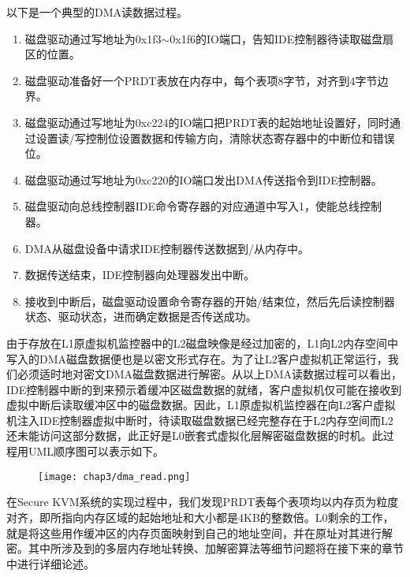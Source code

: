 以下是一个典型的DMA读数据过程。

\begin{enumerate}
\item 磁盘驱动通过写地址为0x1f3$\sim$0x1f6的IO端口，告知IDE控制器待读取磁盘扇区的位置。

\item 磁盘驱动准备好一个PRDT表放在内存中，每个表项8字节，对齐到4字节边界。

\item 磁盘驱动通过写地址为0xc224的IO端口把PRDT表的起始地址设置好，同时通过设置读/写控制位设置数据和传输方向，清除状态寄存器中的中断位和错误位。

\item 磁盘驱动通过写地址为0xc220的IO端口发出DMA传送指令到IDE控制器。

\item 磁盘驱动向总线控制器IDE命令寄存器的对应通道中写入1，使能总线控制器。

\item DMA从磁盘设备中请求IDE控制器传送数据到/从内存中。

\item 数据传送结束，IDE控制器向处理器发出中断。

\item 接收到中断后，磁盘驱动设置命令寄存器的开始/结束位，然后先后读控制器状态、驱动状态，进而确定数据是否传送成功。
\end{enumerate}

由于存放在L1原虚拟机监控器中的L2磁盘映像是经过加密的，L1向L2内存空间中写入的DMA磁盘数据便也是以密文形式存在。为了让L2客户虚拟机正常运行，我们必须适时地对密文DMA磁盘数据进行解密。从以上DMA读数据过程可以看出，IDE控制器中断的到来预示着缓冲区磁盘数据的就绪，客户虚拟机仅可能在接收到虚拟中断后读取缓冲区中的磁盘数据。因此，L1原虚拟机监控器在向L2客户虚拟机注入IDE控制器虚拟中断时，待读取磁盘数据已经完整存在于L2内存空间而L2还未能访问这部分数据，此正好是L0嵌套式虚拟化层解密磁盘数据的时机。此过程用UML顺序图可以表示如下。

\begin{figure}[!htbp]
  \centering
  \texttt{[image: chap3/dma\_read.png]}
\end{figure}

在Secure KVM系统的实现过程中，我们发现PRDT表每个表项均以内存页为粒度对齐，即所指向内存区域的起始地址和大小都是4KB的整数倍。L0剩余的工作，就是将这些用作缓冲区的内存页面映射到自己的地址空间，并在原址对其进行解密。其中所涉及到的多层内存地址转换、加解密算法等细节问题将在接下来的章节中进行详细论述。

